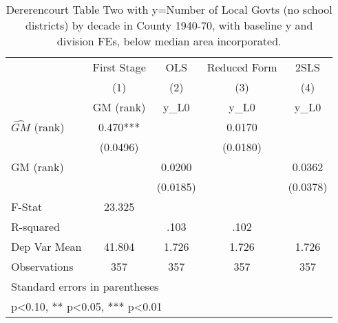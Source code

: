 \begin{table}[htbp]\centering
\def\sym#1{\ifmmode^{#1}\else\(^{#1}\)\fi}
\caption{Dererencourt Table Two with y=Number of Local Govts (no school districts) by decade in County 1940-70, with baseline y and division FEs, below median area incorporated.}
\begin{tabular}{l*{4}{c}}
\toprule
                    & First Stage   &         OLS   &Reduced Form   &        2SLS   \\
                    &\multicolumn{1}{c}{(1)}&\multicolumn{1}{c}{(2)}&\multicolumn{1}{c}{(3)}&\multicolumn{1}{c}{(4)}\\
                    &\multicolumn{1}{c}{GM  (rank)}&\multicolumn{1}{c}{y\_L0}&\multicolumn{1}{c}{y\_L0}&\multicolumn{1}{c}{y\_L0}\\
\midrule
$\hat{GM}$ (rank)   &       0.470***&               &      0.0170   &               \\
                    &    (0.0496)   &               &    (0.0180)   &               \\
\addlinespace
GM  (rank)          &               &      0.0200   &               &      0.0362   \\
                    &               &    (0.0185)   &               &    (0.0378)   \\
\midrule
F-Stat              &      23.325   &               &               &               \\
R-squared           &               &        .103   &        .102   &               \\
Dep Var Mean        &      41.804   &       1.726   &       1.726   &       1.726   \\
Observations        &         357   &         357   &         357   &         357   \\
\bottomrule
\multicolumn{5}{l}{\footnotesize Standard errors in parentheses}\\
\multicolumn{5}{l}{\footnotesize * p<0.10, ** p<0.05, *** p<0.01}\\
\end{tabular}
\end{table}
